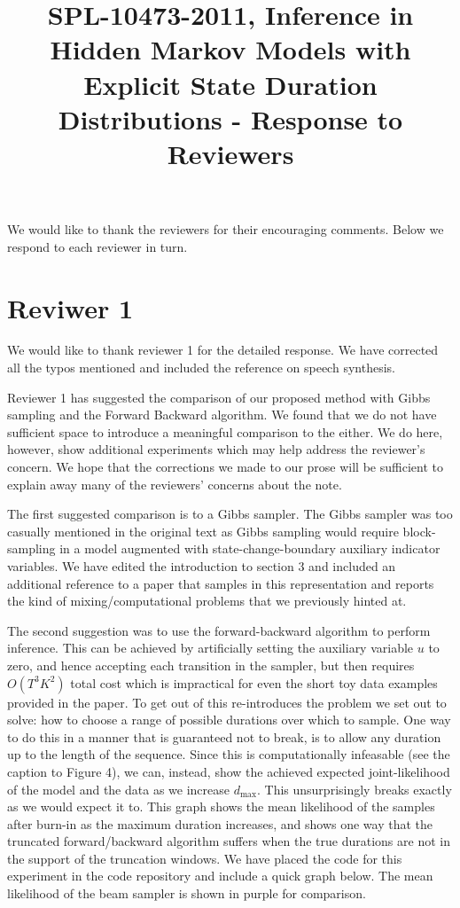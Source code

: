 \documentclass{article}
\title{SPL-10473-2011, Inference in Hidden Markov Models with Explicit State Duration Distributions - Response to Reviewers}
\begin{document}
\maketitle
We would like to thank the reviewers for their encouraging comments. Below we respond to each reviewer in turn.

\section*{Reviwer 1}

We would like to thank reviewer 1 for the detailed response. We have corrected all the typos mentioned and included the reference on speech synthesis. 

Reviewer 1 has suggested the comparison of our proposed method with Gibbs sampling and the Forward Backward algorithm. We found that we do not have sufficient space to introduce a meaningful comparison to the either.  We do here, however, show additional experiments which may help address the reviewer's concern.  We hope that the corrections we made to our prose will be sufficient to explain away many of the reviewers' concerns about the note.

The first suggested comparison is to a Gibbs sampler.  The Gibbs sampler was too casually mentioned in the original text as Gibbs sampling would require block-sampling in a model augmented with state-change-boundary auxiliary indicator variables.   We have edited the introduction to section 3 and included an additional reference to a paper that samples in this representation and reports the kind of mixing/computational problems that we previously hinted at.

The second suggestion was to use the forward-backward algorithm to perform inference. This can be achieved by artificially setting the auxiliary variable $u$ to zero, and hence accepting each transition in the sampler, but then requires $O(T^3K^2)$ total cost which is impractical for even the short toy data examples provided in the paper. To get out of this re-introduces the problem we set out to solve: how to choose a range of possible durations over which to sample. One way to do this in a manner that is guaranteed not to break, is to allow any duration up to the length of the sequence. Since this is computationally infeasable (see the caption to Figure 4), we can, instead, show the achieved expected joint-likelihood of the model and the data as we increase $d_\mathrm{max}$.  This unsurprisingly breaks exactly as we would expect it to.  This graph shows the mean likelihood of the samples after burn-in as the maximum duration increases, and shows one way that the truncated forward/backward algorithm suffers when the true durations are not in the support of the truncation windows.   We have placed the code for this experiment in the code repository and include a quick graph below. The mean likelihood of the beam sampler is shown in purple for comparison. 
\end{document}
